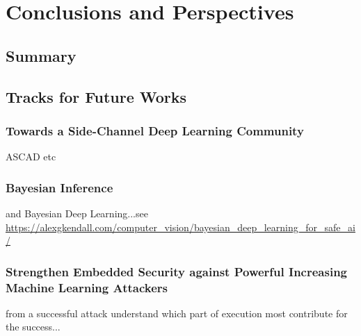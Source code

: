 
\chapter{Conclusions and Perspectives} %

\label{ChapterConclusions}



\section{Summary}

\section{Tracks for Future Works}
\subsection{Towards a Side-Channel Deep Learning Community}
ASCAD etc
\subsection{Bayesian Inference}
and Bayesian Deep Learning...see \url{https://alexgkendall.com/computer_vision/bayesian_deep_learning_for_safe_ai/}

\subsection{Strengthen Embedded Security against Powerful Increasing Machine Learning Attackers}
from a successful attack understand which part of execution most contribute for the success...
